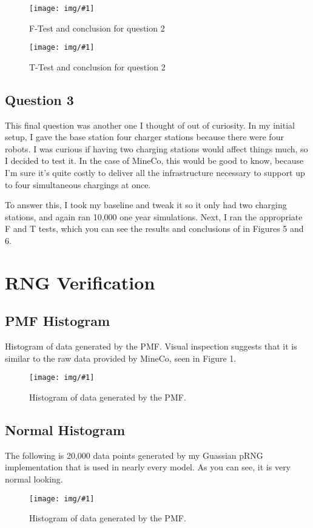 \documentclass{article}
\makeatletter
\def\maxwidth#1{\ifdim\Gin@nat@width>#1 #1\else\Gin@nat@width\fi}
\newcommand{\img}[2]{
	\begin{figure}[ht!]
		\texttt{[image: img/\#1]}
		\centering
		\caption{#2}
	\end{figure}
}
\makeatother
\begin{document}
\img{q2F.png}{F-Test and conclusion for question 2}
\img{q2T.png}{T-Test and conclusion for question 2}

\subsection{Question 3}
This final question was another one I thought of out of curiosity.
In my initial setup, I gave the base station four charger stations because there were four robots.
I was curious if having two charging stations would affect things much, so I decided to test it.
In the case of MineCo, this would be good to know, because I'm sure it's quite costly to deliver all the infrastructure necessary to support up to four simultaneous chargings at once.

To answer this, I took my baseline and tweak it so it only had two charging stations, and again ran 10,000 one year simulations. Next, I ran the appropriate F and T tests, which you can see the results and conclusions of in Figures 5 and 6.

\section{RNG Verification}
\subsection{PMF Histogram}
Histogram of data generated by the PMF. Visual inspection suggests that it is similar to the raw data provided by MineCo, seen in Figure 1.

\img{pmfHist.png}{Histogram of data generated by the PMF.}

\subsection{Normal Histogram}
The following is 20,000 data points generated by my Guassian pRNG implementation that is used in nearly every model. As you can see, it is very normal looking.

\img{normalHist.png}{Histogram of data generated by the PMF.}
\end{document}
